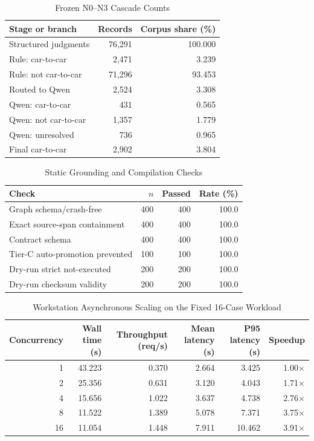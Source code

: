 
\begin{table}[t]
\caption{Frozen N0--N3 Cascade Counts}
\label{tab:cascade}
\centering
\begin{tabular}{lrr}
\hline
Stage or branch & Records & Corpus share (\%) \\
\hline
Structured judgments & 76,291 & 100.000 \\
Rule: car-to-car & 2,471 & 3.239 \\
Rule: not car-to-car & 71,296 & 93.453 \\
Routed to Qwen & 2,524 & 3.308 \\
Qwen: car-to-car & 431 & 0.565 \\
Qwen: not car-to-car & 1,357 & 1.779 \\
Qwen: unresolved & 736 & 0.965 \\
Final car-to-car & 2,902 & 3.804 \\
\hline
\end{tabular}
\end{table}

\begin{table}[t]
\caption{Static Grounding and Compilation Checks}
\label{tab:static-validation}
\centering
\begin{tabular}{lrrr}
\hline
Check & $n$ & Passed & Rate (\%) \\
\hline
Graph schema/crash-free & 400 & 400 & 100.0 \\
Exact source-span containment & 400 & 400 & 100.0 \\
Contract schema & 400 & 400 & 100.0 \\
Tier-C auto-promotion prevented & 100 & 100 & 100.0 \\
Dry-run strict not-executed & 200 & 200 & 100.0 \\
Dry-run checksum validity & 200 & 200 & 100.0 \\
\hline
\end{tabular}
\end{table}

\begin{table}[t]
\caption{Workstation Asynchronous Scaling on the Fixed 16-Case Workload}
\label{tab:async-scaling}
\centering
\begin{tabular}{rrrrrr}
\hline
Concurrency & Wall time (s) & Throughput (req/s) & Mean latency (s) & P95 latency (s) & Speedup \\
\hline
1 & 43.223 & 0.370 & 2.664 & 3.425 & 1.00$\times$ \\
2 & 25.356 & 0.631 & 3.120 & 4.043 & 1.71$\times$ \\
4 & 15.656 & 1.022 & 3.637 & 4.738 & 2.76$\times$ \\
8 & 11.522 & 1.389 & 5.078 & 7.371 & 3.75$\times$ \\
16 & 11.054 & 1.448 & 7.911 & 10.462 & 3.91$\times$ \\
\hline
\end{tabular}
\end{table}

